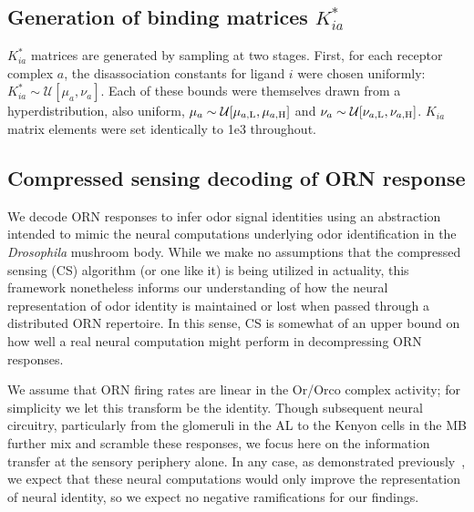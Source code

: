 \subsection{Generation of binding matrices $K^*_{ia}$}
$K_{ia}^*$ matrices are generated by sampling at two stages. First, for each receptor complex $a$, the disassociation constants for ligand $i$ were chosen uniformly: $K^*_{ia} \sim \mathcal U[\mu_a, \nu_a]$. Each of these bounds were themselves drawn from a hyperdistribution, also uniform, $\mu_a \sim \mathcal U[\mu_{a, \text L}, \mu_{a, \text H}]$ and $\nu_a \sim \mathcal U[\nu_{a, \text L}, \nu_{a, \text H}]$. $K_{ia}$ matrix elements were set identically to 1e3 throughout. 


\subsection{Compressed sensing decoding of ORN response}
We decode ORN responses to infer odor signal identities using an abstraction intended to mimic the neural computations underlying odor identification in the \textit{Drosophila} mushroom body. While we make no assumptions that the compressed sensing (CS) algorithm (or one like it) is being utilized in actuality, this framework nonetheless informs our understanding of how the neural representation of odor identity is maintained or lost when passed through a distributed ORN repertoire. In this sense, CS is somewhat of an upper bound on how well a real neural computation might perform in decompressing ORN responses.

We assume that ORN firing rates are linear in the Or/Orco complex activity; for simplicity we let this transform be the identity. Though subsequent neural circuitry, particularly from the glomeruli in the AL to the Kenyon cells in the MB further mix and scramble these responses, we focus here on the information transfer at the sensory periphery alone. In any case, as demonstrated previously~\cite{vijay_1}, we expect that these neural computations would only improve the representation of neural identity, so we expect no negative ramifications for our findings.

